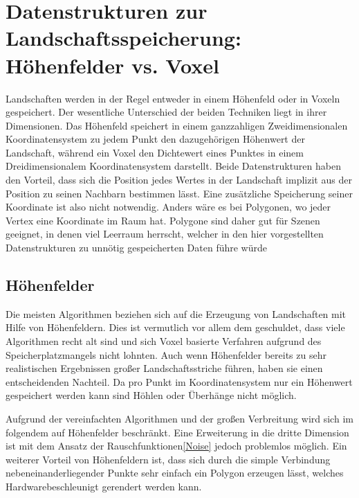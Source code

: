 
\section{Datenstrukturen zur Landschaftsspeicherung: Höhenfelder vs. Voxel}
Landschaften werden in der Regel entweder in einem Höhenfeld oder in Voxeln gespeichert.
Der wesentliche Unterschied der beiden Techniken liegt in ihrer Dimensionen. Das Höhenfeld speichert in einem ganzzahligen Zweidimensionalen Koordinatensystem zu jedem Punkt den dazugehörigen Höhenwert der Landschaft, während ein Voxel den Dichtewert eines Punktes in einem Dreidimensionalem Koordinatensystem darstellt. Beide Datenstrukturen haben den Vorteil, dass sich die Position jedes Wertes in der Landschaft implizit aus der Position zu seinen Nachbarn bestimmen lässt. Eine zusätzliche Speicherung seiner Koordinate ist also nicht notwendig. Anders wäre es bei Polygonen, wo jeder Vertex eine Koordinate im Raum hat. Polygone sind daher gut für Szenen geeignet, in denen viel Leerraum herrscht, welcher in den hier vorgestellten Datenstrukturen zu unnötig gespeicherten Daten führe würde

\subsection{Höhenfelder}
Die meisten Algorithmen beziehen sich auf die Erzeugung von Landschaften mit Hilfe von Höhenfeldern. Dies ist vermutlich vor allem dem geschuldet, dass viele Algorithmen recht alt sind und sich Voxel basierte Verfahren aufgrund des Speicherplatzmangels nicht lohnten.
Auch wenn Höhenfelder bereits zu sehr realistischen Ergebnissen großer Landschaftsstriche führen, haben sie einen entscheidenden Nachteil. Da pro Punkt im Koordinatensystem nur ein Höhenwert gespeichert werden kann sind Höhlen oder Überhänge nicht möglich.

Aufgrund der vereinfachten Algorithmen und der großen Verbreitung wird sich im folgendem auf Höhenfelder beschränkt. Eine Erweiterung in die dritte Dimension ist mit dem Ansatz der Rauschfunktionen\ref{Noise} jedoch problemlos möglich.
Ein weiterer Vorteil von Höhenfeldern ist, dass sich durch die simple Verbindung nebeneinanderliegender Punkte sehr einfach ein Polygon erzeugen lässt, welches Hardwarebeschleunigt gerendert werden kann.

